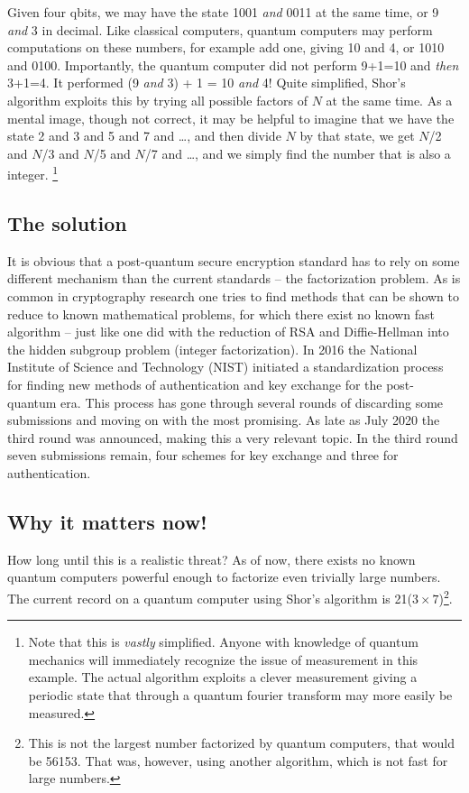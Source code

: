 \documentclass[conference]{IEEEtran}
\begin{document}
Given four qbits, we may have the state 1001 \emph{and} 0011 at the same time, or 9 \emph{and} 3 in decimal.
Like classical computers, quantum computers may perform computations on these numbers, for example add one, giving 10 and 4, or 1010 and 0100.
Importantly, the quantum computer did not perform 9+1=10 and \emph{then} 3+1=4.
It performed (9 \emph{and} 3) + 1 = 10 \emph{and} 4!
Quite simplified, Shor's algorithm exploits this by trying all possible factors of $N$ at the same time.
As a mental image, though not correct, it may be helpful to imagine that we have the state 2 and 3 and 5 and 7 and \dots, and then divide $N$ by that state, we get $N$/2 and $N$/3 and $N$/5 and $N$/7 and \dots, and we simply find the number that is also a integer. \footnote{Note that this is \emph{vastly} simplified. Anyone with knowledge of quantum mechanics will immediately recognize the issue of measurement in this example. The actual algorithm exploits a clever measurement giving a periodic state that through a quantum fourier transform may more easily be measured.}


\subsection{The solution}
It is obvious that a post-quantum secure encryption standard has to rely on some different mechanism than the current standards -- the factorization problem.
As is common in cryptography research one tries to find methods that can be shown to reduce to known mathematical problems, for which there exist no known fast algorithm -- just like one did with the reduction of RSA and Diffie-Hellman into the hidden subgroup problem (integer factorization).
In 2016 the National Institute of Science and Technology (NIST) initiated a standardization process for finding new methods of authentication and key exchange for the post-quantum era.
This process has gone through several rounds of discarding some submissions and moving on with the most promising.
As late as July 2020 the third round was announced, making this a very relevant topic.
In the third round seven submissions remain, four schemes for key exchange and three for authentication.


\subsection{Why it matters now!}
How long until this is a realistic threat?
As of now, there exists no known quantum computers powerful enough to factorize even trivially large numbers.
The current record on a quantum computer using Shor's algorithm is 21($3\times7$)\footnote{This is not the largest number factorized by quantum computers, that would be 56153. That was, however, using another algorithm, which is not fast for large numbers.}\cite{shor21}.
\end{document}
